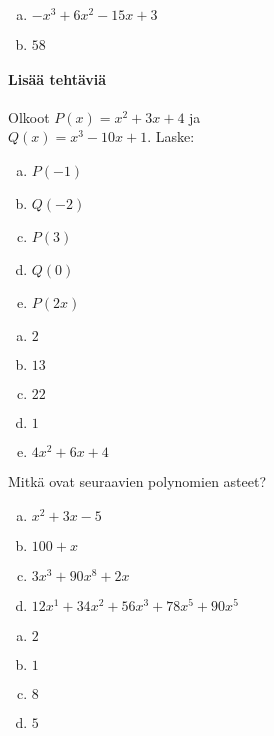 \begin{tehtavasivu}
\begin{tehtava}
	\begin{vastaus}
		\begin{enumerate}[a)]
			\item $-x^3+6x^2-15x+3$
			\item $58$
	\end{enumerate}
	\end{vastaus}
\end{tehtava}


\paragraph*{Lisää tehtäviä}

\begin{tehtava}
    Olkoot $P(x)=x^2+3x+4$ ja \\ $Q(x)=x^3-10x+1$. Laske:
    \begin{enumerate}[a)]
        \item $P(-1)$
        \item $Q(-2)$
        \item $P(3)$
        \item $Q(0)$
        \item $P(2x)$
    \end{enumerate}
    \begin{vastaus}
        \begin{enumerate}[a)]
            \item $2$
            \item $13$
            \item $22$
            \item $1$
            \item $4x^2+6x+4$
        \end{enumerate}
    \end{vastaus}
\end{tehtava}


\begin{tehtava}
	Mitkä ovat seuraavien polynomien asteet?
	\begin{enumerate}[a)]
		\item $x^2 + 3x - 5$
		\item $100 + x$
		\item $3x^3 + 90x^8 + 2x$
		\item $12x^1 + 34x^2 + 56x^3 + 78x^5 + 90x^5$
	\end{enumerate}

	\begin{vastaus}
		\begin{enumerate}[a)]
			\item $2$
			\item $1$
			\item $8$
			\item $5$
		\end{enumerate}
	\end{vastaus}
\end{tehtava}


\end{tehtavasivu}

